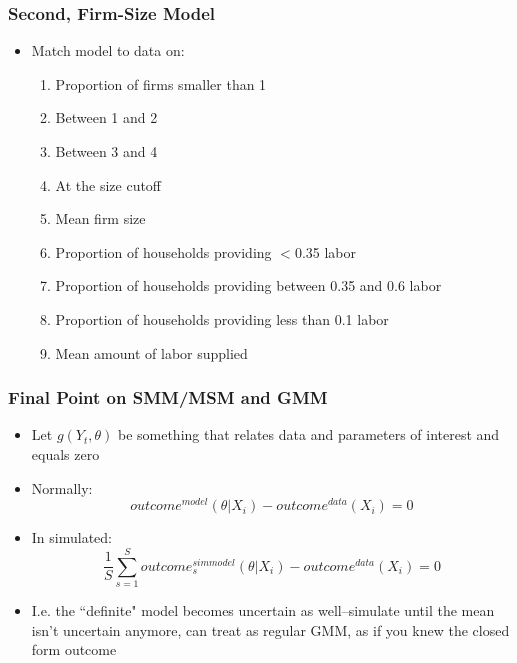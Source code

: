 \documentclass{beamer}
\begin{document}
\begin{frame}
\frametitle{Second, Firm-Size Model}
\begin{itemize}
\item Match model to data on:
\begin{enumerate}
\item Proportion of firms smaller than 1
\item Between 1 and 2
\item Between 3 and 4
\item At the size cutoff
\item Mean firm size
\item Proportion of households providing $<$0.35 labor
\item Proportion of households providing between 0.35 and 0.6 labor
\item Proportion of households providing less than 0.1 labor
\item Mean amount of labor supplied
\end{enumerate}
\end{itemize}
\end{frame}

\begin{frame}
\frametitle{Final Point on SMM/MSM and GMM}
\begin{itemize}
\item Let $g(Y_t,\theta)$ be something that relates data and parameters of interest and equals zero
\bigskip
\item Normally: $$outcome^{model}(\theta|X_i)-outcome^{data}(X_i)=0$$
\item In simulated: $$\frac{1}{S}\sum_{s=1}^{S}outcome_s^{simmodel}(\theta|X_i)-outcome^{data}(X_i)=0$$
\item I.e. the ``definite" model becomes uncertain as well--simulate until the mean isn't uncertain anymore, can treat as regular GMM, as if you knew the closed form outcome
\end{itemize}
\end{frame}


\end{document}
